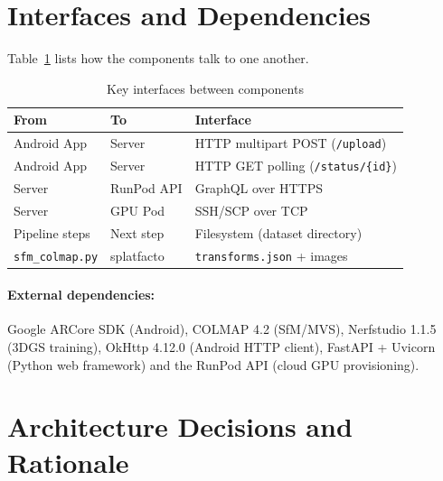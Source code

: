 \section{Interfaces and Dependencies}

Table~\ref{tab:interfaces} lists how the components talk to one another.

\begin{table}[htbp]
\centering
\small
\caption{Key interfaces between components}
\label{tab:interfaces}
\begin{tabular}{p{3cm}p{3cm}p{5cm}}
\toprule
\textbf{From} & \textbf{To} & \textbf{Interface} \\
\midrule
Android App & Server & HTTP multipart POST (\texttt{/upload}) \\
Android App & Server & HTTP GET polling (\texttt{/status/\{id\}}) \\
Server & RunPod API & GraphQL over HTTPS \\
Server & GPU Pod & SSH/SCP over TCP \\
Pipeline steps & Next step & Filesystem (dataset directory) \\
\texttt{sfm\_colmap.py} & splatfacto & \texttt{transforms.json} + images \\
\bottomrule
\end{tabular}
\end{table}

\paragraph{External dependencies:} Google ARCore SDK (Android), COLMAP 4.2 (SfM/MVS), Nerfstudio 1.1.5 (3DGS training), OkHttp 4.12.0 (Android HTTP client), FastAPI + Uvicorn (Python web framework) and the RunPod API (cloud GPU provisioning).

\section{Architecture Decisions and Rationale}

